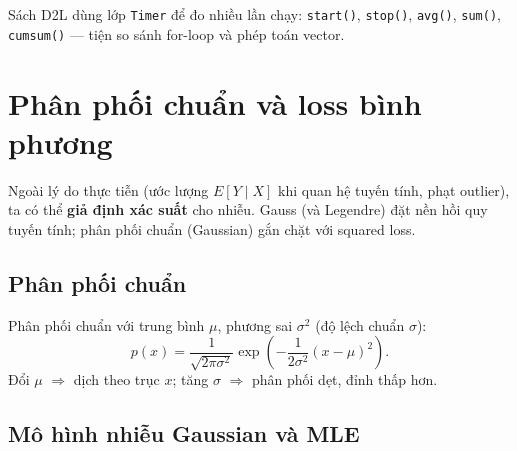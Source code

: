 \documentclass[12pt,a4paper]{article}
\begin{document}
\begin{phuongphap}[title={Lớp Timer (D2L)}]
Sách D2L dùng lớp \texttt{Timer} để đo nhiều lần chạy: \texttt{start()}, \texttt{stop()}, \texttt{avg()}, \texttt{sum()}, \texttt{cumsum()} --- tiện so sánh for-loop và phép toán vector.
\end{phuongphap}

\newpage

\section{Phân phối chuẩn và loss bình phương}

\begin{ynghia}[title={Động lực xác suất cho squared loss}]
Ngoài lý do thực tiễn (ước lượng $E[Y\mid X]$ khi quan hệ tuyến tính, phạt outlier), ta có thể \textbf{giả định xác suất} cho nhiễu. Gauss (và Legendre) đặt nền hồi quy tuyến tính; phân phối chuẩn (Gaussian) gắn chặt với squared loss.
\end{ynghia}

\subsection{Phân phối chuẩn}

\begin{congthuc}[title={Mật độ Gaussian}]
Phân phối chuẩn với trung bình $\mu$, phương sai $\sigma^2$ (độ lệch chuẩn $\sigma$):
\begin{equation}\label{eq:gauss}
  p(x) = \frac{1}{\sqrt{2\pi\sigma^2}}
  \exp\left(-\frac{1}{2\sigma^2}(x - \mu)^2\right).
\end{equation}
Đổi $\mu$ $\Rightarrow$ dịch theo trục $x$; tăng $\sigma$ $\Rightarrow$ phân phối dẹt, đỉnh thấp hơn.
\end{congthuc}

\subsection{Mô hình nhiễu Gaussian và MLE}
\end{document}
